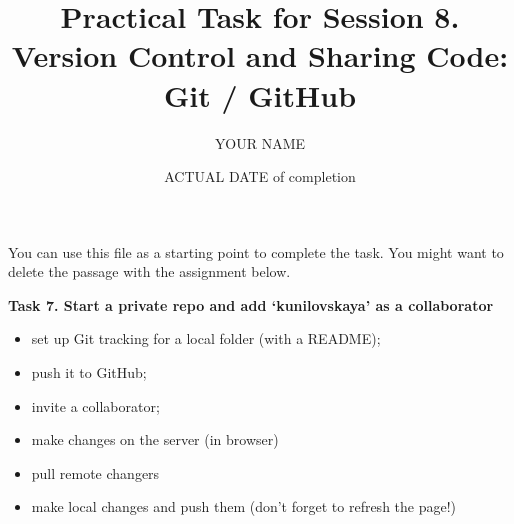 \documentclass[a4paper,11pt]{article}
\title{Practical Task for Session 8. \\Version Control and Sharing Code: Git / GitHub}
\author{YOUR NAME}
\date{ACTUAL DATE of completion}
\begin{document}
	
	\maketitle

\bigskip

You can use this file as a starting point to complete the task. You might want to delete the passage with the assignment below.

\bigskip

\textbf{Task 7. Start a private repo and add `kunilovskaya' as a collaborator}

\begin{itemize}
	\item set up Git tracking for a local folder (with a README);
	\item push it to GitHub;  
	\item invite a collaborator;
	\item make changes on the server (in browser)
	\item pull remote changers
	\item make local changes and push them (don't forget to refresh the page!)
\end{itemize}
	
\end{document}
